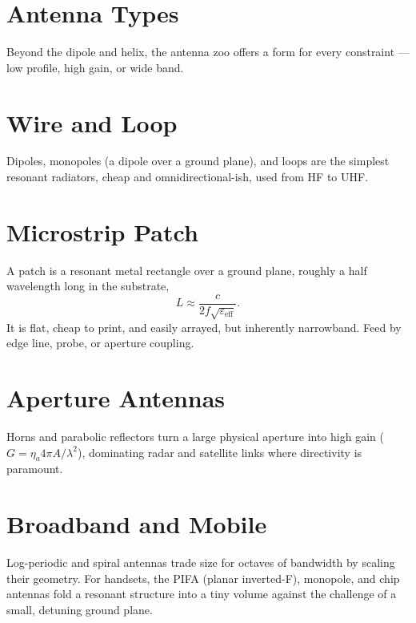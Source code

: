 \section{Antenna Types}\label{sec:tb_antenna_types}



Beyond the dipole and helix, the antenna zoo offers a form for every constraint
--- low profile, high gain, or wide band.

\section{Wire and Loop}
Dipoles, monopoles (a dipole over a ground plane), and loops are the simplest
resonant radiators, cheap and omnidirectional-ish, used from HF to UHF.

\section{Microstrip Patch}
A patch is a resonant metal rectangle over a ground plane, roughly a half
wavelength long in the substrate,
\[ L \approx \frac{c}{2 f\sqrt{\varepsilon_{\text{eff}}}}. \]
It is flat, cheap to print, and easily arrayed, but inherently narrowband. Feed
by edge line, probe, or aperture coupling.

\section{Aperture Antennas}
Horns and parabolic reflectors turn a large physical aperture into high gain
($G = \eta_a 4\pi A/\lambda^2$), dominating radar and satellite links where
directivity is paramount.

\section{Broadband and Mobile}
Log-periodic and spiral antennas trade size for octaves of bandwidth by scaling
their geometry. For handsets, the PIFA (planar inverted-F), monopole, and chip
antennas fold a resonant structure into a tiny volume against the challenge of a
small, detuning ground plane.



